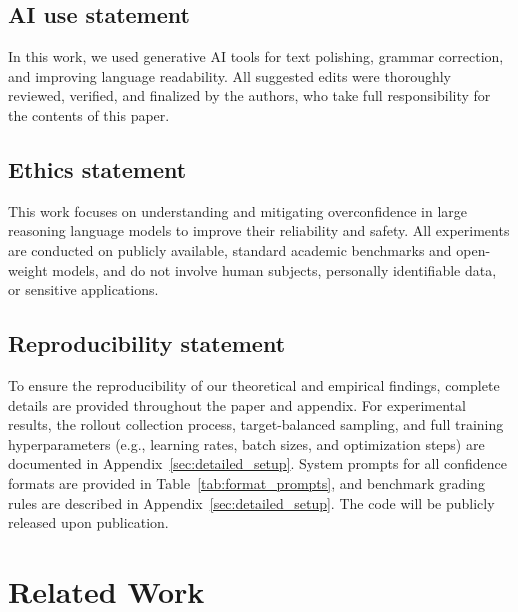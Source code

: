 \documentclass{article} %
\begin{document}
\subsection*{AI use statement}
In this work, we used generative AI tools for text polishing, grammar correction, and improving language readability. 
All suggested edits were thoroughly reviewed, verified, and finalized by the authors, who take full responsibility for the contents of this paper.

\subsection*{Ethics statement}
This work focuses on understanding and mitigating overconfidence in large reasoning language models to improve their reliability and safety. 
All experiments are conducted on publicly available, standard academic benchmarks and open-weight models, and do not involve human subjects, personally identifiable data, or sensitive applications. 

\subsection*{Reproducibility statement}
To ensure the reproducibility of our theoretical and empirical findings, complete details are provided throughout the paper and appendix. 
For experimental results, the rollout collection process, target-balanced sampling, and full training hyperparameters (e.g., learning rates, batch sizes, and optimization steps) are documented in Appendix~\ref{sec:detailed_setup}.
System prompts for all confidence formats are provided in Table~\ref{tab:format_prompts}, and benchmark grading rules are described in Appendix~\ref{sec:detailed_setup}.
The code will be publicly released upon publication.





\appendix

\renewcommand{\contentsname}{Appendix}
\clearpage
{\hypersetup{linkcolor=mydarkblue,linktoc=all}\tableofcontents}

\section{Related Work}
\end{document}
